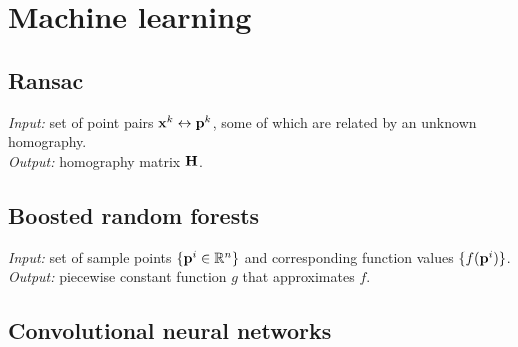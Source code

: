 
\section{Machine learning}

\subsection{Ransac}

\textit{Input:} set of point pairs $\mathbf{x}^k \leftrightarrow \mathbf{p}^k$, some of which are related by an unknown homography.\\
\textit{Output:} homography matrix $\mathbf{H}$.\\

\subsection{Boosted random forests}

\textit{Input:} set of sample points $\{\mathbf{p}^i \in \mathbb{R}^n \}$ and corresponding function values $\{ f(\mathbf{p}^i) \}$.\\
\textit{Output:} piecewise constant function $g$ that approximates $f$.\\

\subsection{Convolutional neural networks}
